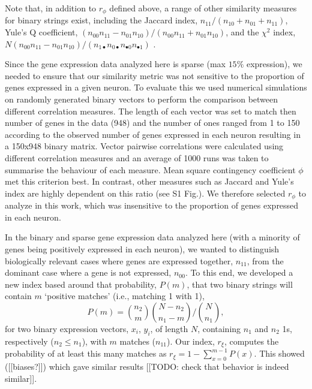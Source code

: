 \documentclass[10pt,letterpaper]{article}
\begin{document}
Note that, in addition to $r_\phi$ defined above, a range of other similarity measures for binary strings exist, including the
Jaccard index, $n_{11}/(n_{10}+n_{01}+n_{11})$,
Yule's Q coefficient, $(n_{00}n_{11} - n_{01}n_{10})/(n_{00}n_{11} + n_{01}n_{10})$,
and the $\chi^2$ index, $N (n_{00}n_{11} - n_{01}n_{10})/(n_{1\bullet}n_{0\bullet}n_{\bullet 0}n_{\bullet 1})$ \cite{Kaufman2006}.

Since the gene expression data analyzed here is sparse (max $15\%$ expression), we needed to ensure that our similarity metric was not sensitive to the proportion of genes expressed in a given neuron. 
To evaluate this we used numerical simulations on randomly generated binary vectors to perform the comparison between different correlation measures. 
The length of each vector was set to match then number of genes in the data (948) and the number of ones ranged from 1 to 150 according to the observed number of genes expressed in each neuron resulting in a 150x948 binary matrix.
Vector pairwise correlations were calculated using different correlation measures and an average of 1000 runs was taken to summarise the behaviour of each measure. 
Mean square contingency coefficient $\phi$ met this criterion best. 
In contrast, other measures such as Jaccard and Yule's index are highly dependent on this ratio (see S1 Fig.).%
We therefore selected $r_\phi$ to analyze in this work, which was insensitive to the proportion of genes expressed in each neuron.

In the binary and sparse gene expression data analyzed here (with a minority of genes being positively expressed in each neuron), we wanted to distinguish biologically relevant cases where genes are expressed together, $n_{11}$, from the dominant case where a gene is not expressed, $n_{00}$.
To this end, we developed a new index based around that probability, $P(m)$, that two binary strings will contain $m$ `positive matches' (i.e., matching 1 with 1),
\begin{equation}
    P(m) = \binom{n_2}{m} \binom{N-n_2}{n_1-m} / \binom{N}{n_1},
\end{equation}
for two binary expression vectors, $x_i$, $y_i$, of length $N$, containing $n_1$ and $n_2$ 1s, respectively ($n_2 \leq n_1$), with $m$ matches ($n_{11}$).
Our index, $r_\xi$, computes the probability of at least this many matches as $r_\xi = 1 - \sum_{x=0}^{m-1} P(x)$.
This showed ([[biases?]]) which gave similar results [[TODO: check that behavior is indeed similar]].
\end{document}
